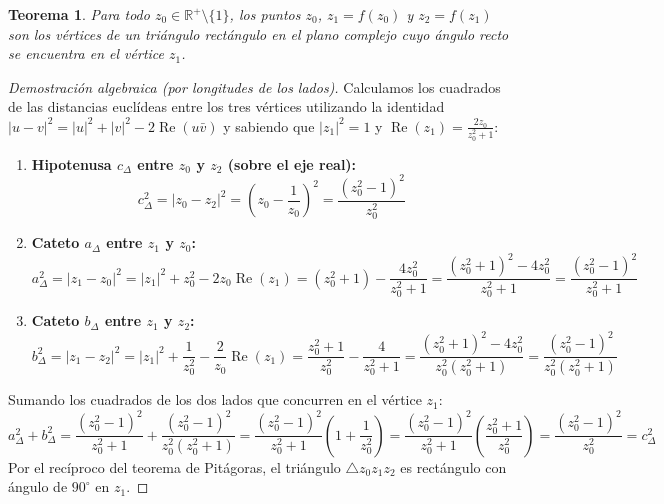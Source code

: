 \documentclass[11pt,a4paper]{article}
\theoremstyle{plain}
\newtheorem{teorema}{Teorema}
\theoremstyle{definition}
\begin{document}
\begin{teorema}
Para todo $z_0 \in \mathbb{R}^+ \setminus \{1\}$, los puntos $z_0$, $z_1 = f(z_0)$ y $z_2 = f(z_1)$ son los vértices de un triángulo rectángulo en el plano complejo cuyo ángulo recto se encuentra en el vértice $z_1$.
\end{teorema}

\begin{proof}[Demostración algebraica (por longitudes de los lados)]
Calculamos los cuadrados de las distancias euclídeas entre los tres vértices utilizando la identidad $|u - v|^2 = |u|^2 + |v|^2 - 2\operatorname{Re}(u\bar{v})$ y sabiendo que $|z_1|^2 = 1$ y $\operatorname{Re}(z_1) = \frac{2z_0}{z_0^2 + 1}$:

\begin{enumerate}
    \item \textbf{Hipotenusa $c_{\Delta}$ entre $z_0$ y $z_2$ (sobre el eje real):}
    \[
    c_{\Delta}^2 = |z_0 - z_2|^2 = \left(z_0 - \frac{1}{z_0}\right)^2 = \frac{(z_0^2 - 1)^2}{z_0^2}
    \]
    
    \item \textbf{Cateto $a_{\Delta}$ entre $z_1$ y $z_0$:}
    \[
    a_{\Delta}^2 = |z_1 - z_0|^2 = |z_1|^2 + z_0^2 - 2z_0\operatorname{Re}(z_1) 
                 = (z_0^2 + 1) - \frac{4z_0^2}{z_0^2 + 1} 
                 = \frac{(z_0^2 + 1)^2 - 4z_0^2}{z_0^2 + 1} 
                 = \frac{(z_0^2 - 1)^2}{z_0^2 + 1}
    \]
    
    \item \textbf{Cateto $b_{\Delta}$ entre $z_1$ y $z_2$:}
    \[
    b_{\Delta}^2 = |z_1 - z_2|^2 = |z_1|^2 + \frac{1}{z_0^2} - \frac{2}{z_0}\operatorname{Re}(z_1) 
                 = \frac{z_0^2 + 1}{z_0^2} - \frac{4}{z_0^2 + 1} 
                 = \frac{(z_0^2 + 1)^2 - 4z_0^2}{z_0^2(z_0^2 + 1)} 
                 = \frac{(z_0^2 - 1)^2}{z_0^2(z_0^2 + 1)}
    \]
\end{enumerate}

Sumando los cuadrados de los dos lados que concurren en el vértice $z_1$:
\[
a_{\Delta}^2 + b_{\Delta}^2 = \frac{(z_0^2 - 1)^2}{z_0^2 + 1} + \frac{(z_0^2 - 1)^2}{z_0^2(z_0^2 + 1)} 
= \frac{(z_0^2 - 1)^2}{z_0^2 + 1}\left(1 + \frac{1}{z_0^2}\right) 
= \frac{(z_0^2 - 1)^2}{z_0^2 + 1}\left(\frac{z_0^2 + 1}{z_0^2}\right) 
= \frac{(z_0^2 - 1)^2}{z_0^2} = c_{\Delta}^2
\]
Por el recíproco del teorema de Pitágoras, el triángulo $\triangle z_0 z_1 z_2$ es rectángulo con ángulo de $90^\circ$ en $z_1$.
\end{proof}
\end{document}
